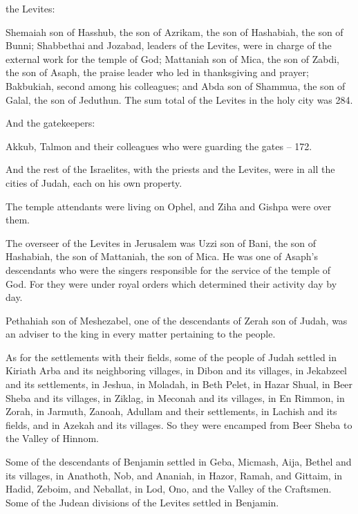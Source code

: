 {the Levites:
\par }{\PP Shemaiah
son
of Hasshub,
the son
of Azrikam,
the son
of Hashabiah,
the son
of Bunni;
Shabbethai
and Jozabad,
leaders
of the Levites,
were in charge of
the external
work
for the temple
of God;
Mattaniah
son
of Mica,
the son
of Zabdi,
the son
of Asaph,
the praise leader
who led
in thanksgiving
and prayer;
Bakbukiah,
second
among his colleagues;
and Abda
son
of Shammua,
the son
of Galal,
the son
of Jeduthun.
The sum total
of the Levites
in the holy
city
was 284.
\par }{\PP {}And the gatekeepers:
\par }{\PP Akkub,
Talmon
and their colleagues
who were guarding
the gates
– 172.
\par }{\PP {}And the rest
of the Israelites,
with the priests
and the Levites,
were in all
the cities
of Judah,
each
on his own property.
\par }{\PP {}The temple attendants
were living
on Ophel,
and Ziha
and Gishpa
were over them.
\par }{\PP {}The overseer
of the Levites
in Jerusalem
was Uzzi
son
of Bani,
the son
of Hashabiah,
the son
of Mattaniah,
the son
of Mica.
He was one of Asaph’s
descendants
who were the singers
responsible
for the service
of the temple
of God.
For
they were under royal
orders
which determined their activity
day
by day.
\par }{\PP {}Pethahiah
son
of Meshezabel,
one of the descendants
of Zerah
son
of Judah,
was an adviser to the king
in every
matter
pertaining to the people.
\par }{\PP {}As for the settlements
with their fields,
some of the people of Judah
settled
in Kiriath Arba
and its neighboring villages,
in Dibon
and its villages,
in Jekabzeel
and its settlements,
in Jeshua,
in Moladah,
in Beth Pelet,
in Hazar Shual,
in Beer Sheba
and its villages,
in Ziklag,
in Meconah
and its villages,
in En Rimmon,
in Zorah,
in Jarmuth,
Zanoah,
Adullam
and their settlements,
in Lachish
and its fields,
and in Azekah
and its villages.
So they were encamped
from Beer Sheba
to
the Valley
of Hinnom.
\par }{\PP {}Some of the descendants
of Benjamin
settled in Geba,
Micmash,
Aija,
Bethel
and its villages,
in Anathoth,
Nob,
and Ananiah,
in Hazor,
Ramah,
and Gittaim,
in Hadid,
Zeboim,
and Neballat,
in Lod,
Ono,
and the Valley
of the Craftsmen.
Some
of the Judean
divisions
of the Levites
settled in Benjamin.

}
